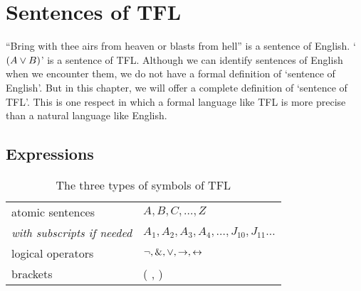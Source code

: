 







\chapter{Sentences of TFL}\label{s:TFLSentences}

``Bring with thee airs from heaven or blasts from hell'' is a sentence of English. `$(A \vee B)$' is a sentence of TFL. Although we can identify sentences of English when we encounter them, we do not have a formal definition of `sentence of English'. But in this chapter, we will offer a complete definition of `sentence of TFL'. This is one respect in which a formal language like TFL is more precise than a natural language like English.


\section{Expressions}

\begin{table*}\centering\sffamily\footnotesize
{}
\begin{tabular}{@{}l l@{}}\toprule
atomic sentences & $A,B,C,\ldots,Z$\\
\enspace \textit{with subscripts if needed} & $A_1, A_2, A_3,A_4, \ldots, J_{10}, J_{11}\ldots$\\
logical operators & ${\neg},\mathbin{\&},\vee,\rightarrow,\leftrightarrow$\\
brackets &( , )\\
\bottomrule
\end{tabular}
\caption{The three types of symbols of TFL}\label{table.symbols-TFL}
\end{table*}


